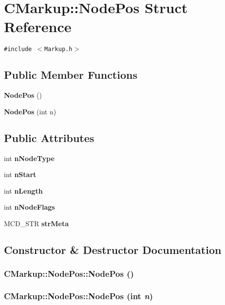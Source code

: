 \section{CMarkup::NodePos Struct Reference}
\label{structCMarkup_1_1NodePos}
{\tt \#include $<$Markup.h$>$}

\subsection*{Public Member Functions}
\begin{CompactItemize}
\item 
{\bf NodePos} ()
\item 
{\bf NodePos} (int n)
\end{CompactItemize}
\subsection*{Public Attributes}
\begin{CompactItemize}
\item 
int {\bf nNodeType}
\item 
int {\bf nStart}
\item 
int {\bf nLength}
\item 
int {\bf nNodeFlags}
\item 
MCD\_\-STR {\bf strMeta}
\end{CompactItemize}


\subsection{Constructor \& Destructor Documentation}
\subsubsection[NodePos]{\setlength{\rightskip}{0pt plus 5cm}CMarkup::NodePos::NodePos ()\hspace{0.3cm}{\tt  [inline]}}\label{structCMarkup_1_1NodePos_81589c934561c891174be880864053b6}


\subsubsection[NodePos]{\setlength{\rightskip}{0pt plus 5cm}CMarkup::NodePos::NodePos (int {\em n})\hspace{0.3cm}{\tt  [inline]}}\label{structCMarkup_1_1NodePos_aaecb8354ffd5605e80432377fa2ac4c}




